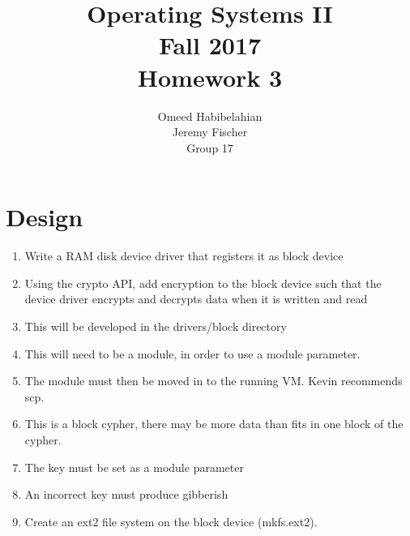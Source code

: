 \documentclass[draftclsnofoot, onecolumn, 10pt, compsoc]{IEEEtran}
\title{\textbf{Operating Systems II}\\Fall 2017\\Homework 3}
\author{Omeed Habibelahian\\Jeremy Fischer\\Group 17}
\begin{document}
	\maketitle
	\newpage
	
	\section{Design}
		\begin{enumerate}
			\item Write a RAM disk device driver that registers it as block device
			\item Using the crypto API, add encryption to the block device such that the device driver encrypts and decrypts data when it is written and read
			\item This will be developed in the drivers/block directory
			\item This will need to be a module, in order to use a module parameter.
			\item The module must then be moved in to the running VM. Kevin recommends scp.
			\item This is a block cypher, there may be more data than fits in one block of the cypher.
			\item The key must be set as a module parameter
			\item An incorrect key must produce gibberish
			\item Create an ext2 file system on the block device (mkfs.ext2).
		\end{enumerate}
	
\end{document}
